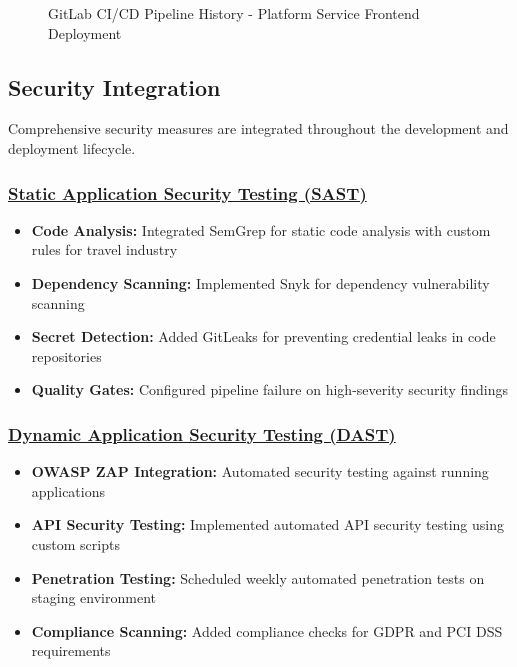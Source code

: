 \begin{figure}[H]
    \centering
    \caption{GitLab CI/CD Pipeline History - Platform Service Frontend Deployment}
    \label{fig:pipeline-history-platform}
\end{figure}

\subsection{Security Integration}
Comprehensive security measures are integrated throughout the development and deployment lifecycle.

\subsubsection*{\underline{Static Application Security Testing (SAST)}}
\begin{itemize}
    \item \textbf{Code Analysis:} Integrated SemGrep for static code analysis with custom rules for travel industry
    \item \textbf{Dependency Scanning:} Implemented Snyk for dependency vulnerability scanning
    \item \textbf{Secret Detection:} Added GitLeaks for preventing credential leaks in code repositories
    \item \textbf{Quality Gates:} Configured pipeline failure on high-severity security findings
\end{itemize}

\subsubsection*{\underline{Dynamic Application Security Testing (DAST)}}
\begin{itemize}
    \item \textbf{OWASP ZAP Integration:} Automated security testing against running applications
    \item \textbf{API Security Testing:} Implemented automated API security testing using custom scripts
    \item \textbf{Penetration Testing:} Scheduled weekly automated penetration tests on staging environment
    \item \textbf{Compliance Scanning:} Added compliance checks for GDPR and PCI DSS requirements
\end{itemize}

